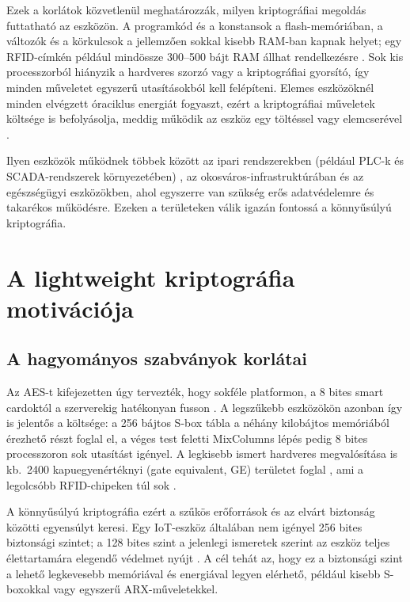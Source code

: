\documentclass[a4paper,12pt]{report}
\theoremstyle{definition}
\theoremstyle{remark}
\begin{document}
Ezek a korlátok közvetlenül meghatározzák, milyen kriptográfiai megoldás futtatható az eszközön. A programkód és a konstansok a flash-memóriában, a változók és a körkulcsok a jellemzően sokkal kisebb RAM-ban kapnak helyet; egy RFID-címkén például mindössze 300--500 bájt RAM állhat rendelkezésre \cite{Hatzivasilis2018}. Sok kis processzorból hiányzik a hardveres szorzó vagy a kriptográfiai gyorsító, így minden műveletet egyszerű utasításokból kell felépíteni. Elemes eszközöknél minden elvégzett óraciklus energiát fogyaszt, ezért a kriptográfiai műveletek költsége is befolyásolja, meddig működik az eszköz egy töltéssel vagy elemcserével \cite{NISTIR8114}.

Ilyen eszközök működnek többek között az ipari rendszerekben (például PLC-k és SCADA-rendszerek környezetében) \cite{Sadeghi2015}, az okosváros-infrastruktúrában és az egészségügyi eszközökben, ahol egyszerre van szükség erős adatvédelemre és takarékos működésre. Ezeken a területeken válik igazán fontossá a könnyűsúlyú kriptográfia.

\section{A lightweight kriptográfia motivációja}\label{sec:lwc_motivacio}

\subsection{A hagyományos szabványok korlátai}

Az AES-t kifejezetten úgy tervezték, hogy sokféle platformon, a 8 bites smart cardoktól a szerverekig hatékonyan fusson \cite{DaemenRijmen2002}. A legszűkebb eszközökön azonban így is jelentős a költsége: a 256 bájtos S-box tábla a néhány kilobájtos memóriából érezhető részt foglal el, a véges test feletti MixColumns lépés pedig 8 bites processzoron sok utasítást igényel. A legkisebb ismert hardveres megvalósítása is kb.\ 2400 kapuegyenértéknyi (gate equivalent, GE) területet foglal \cite{Moradi2011}, ami a legolcsóbb RFID-chipeken túl sok \cite{NISTIR8114}.

A könnyűsúlyú kriptográfia ezért a szűkös erőforrások és az elvárt biztonság közötti egyensúlyt keresi. Egy IoT-eszköz általában nem igényel 256 bites biztonsági szintet; a 128 bites szint a jelenlegi ismeretek szerint az eszköz teljes élettartamára elegendő védelmet nyújt \cite{Biryukov2017}. A cél tehát az, hogy ez a biztonsági szint a lehető legkevesebb memóriával és energiával legyen elérhető, például kisebb S-boxokkal vagy egyszerű ARX-műveletekkel.
\end{document}
